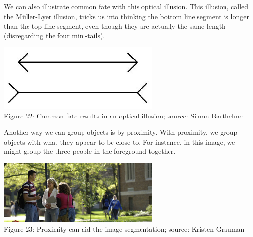 \documentclass{article}
\begin{document}
We can also illustrate common fate with this optical illusion. This illusion, called the Müller-Lyer illusion, tricks us into thinking the bottom line segment is longer than the top line segment, even though they are actually the same length (disregarding the four mini-tails).

\begin{center}
\includegraphics[width=8cm]{muller.jpg} \\
Figure 22: Common fate results in an optical illusion; source: Simon Barthelme
\end{center}

Another way we can group objects is by proximity. With proximity, we group objects with what they appear to be close to. For instance, in this image, we might group the three people in the foreground together.
\begin{center}
\includegraphics[width=8cm]{people.png} \\
Figure 23: Proximity can aid the image segmentation; source: Kristen Grauman
\end{center}


\small


\end{document}
